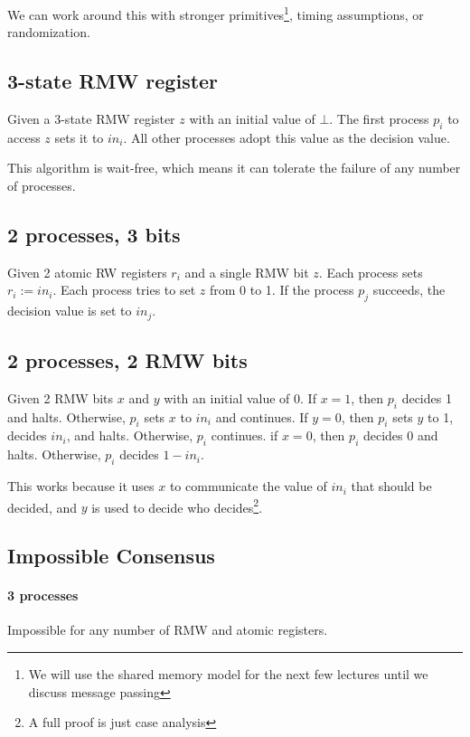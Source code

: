 \documentclass{idc_msc}
\begin{document}
We can work around this with stronger primitives\footnote{We will use the shared memory model for the next few lectures until we discuss message passing}, timing assumptions, or randomization.

\subsection{3-state RMW register}

Given a 3-state RMW register $z$ with an initial value of $\bot$.
The first process $p_i$ to access $z$ sets it to $in_i$.
All other processes adopt this value as the decision value.

This algorithm is wait-free, which means it can tolerate the failure of any number of processes.

\subsection{2 processes, 3 bits}

Given 2 atomic RW registers $r_i$ and a single RMW bit $z$.
Each process sets $r_i := in_i$.
Each process tries to set $z$ from 0 to 1.
If the process $p_j$ succeeds, the decision value is set to $in_j$.

\subsection{2 processes, 2 RMW bits}

Given 2 RMW bits $x$ and $y$ with an initial value of 0.
If $x=1$, then $p_i$ decides 1 and halts. Otherwise, $p_i$ sets $x$ to $in_i$ and continues.
If $y=0$, then $p_i$ sets $y$ to 1, decides $in_i$, and halts. Otherwise, $p_i$ continues.
if $x=0$, then $p_i$ decides 0 and halts. Otherwise, $p_i$ decides $1 - in_i$.

This works because it uses $x$ to communicate the value of $in_i$ that should be decided, and $y$ is used to decide who decides\footnote{A full proof is just case analysis}.

\subsection{Impossible Consensus}

\paragraph{3 processes}

Impossible for any number of RMW and atomic registers.
\end{document}
